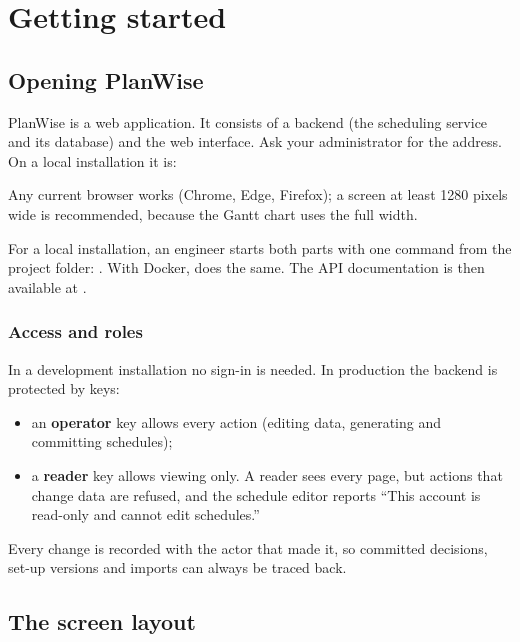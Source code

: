 \chapter{Getting started}\label{ch:start}

\section{Opening PlanWise}

PlanWise is a web application. It consists of a backend (the scheduling service and its database) and the
web interface. Ask your administrator for the address. On a local installation it is:

\centerline{}

Any current browser works (Chrome, Edge, Firefox); a screen at least 1280 pixels wide is recommended,
because the Gantt chart uses the full width.

\begin{note}
For a local installation, an engineer starts both parts with one command from the project folder:
. With Docker,  does the same. The API documentation is then available at
.
\end{note}

\subsection{Access and roles}

In a development installation no sign-in is needed. In production the backend is protected by keys:

\begin{itemize}
  \item an \textbf{operator} key allows every action (editing data, generating and committing schedules);
  \item a \textbf{reader} key allows viewing only. A reader sees every page, but actions that change data are
        refused, and the schedule editor reports ``This account is read-only and cannot edit schedules.''
\end{itemize}

Every change is recorded with the actor that made it, so committed decisions, set-up versions and imports
can always be traced back.

\section{The screen layout}\label{sec:layout}

